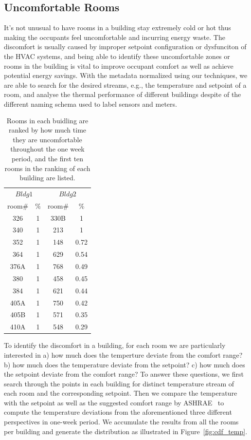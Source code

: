 \subsection{Uncomfortable Rooms}
It's not unusual to have rooms in a building stay extremely cold or hot thus making the occupants feel uncomfortable and incurring energy waste. The discomfort is usually caused by improper setpoint configuration or dysfunciton of the HVAC systems, and being able to identify these uncomfortable zones or rooms in the building is vital to improve occupant comfort as well as achieve potential energy savings. With the metadata normalized using our techniques, we are able to search for the desired streams, e.g., the temperature and setpoint of a room, and analyse the thermal performance of different buildings despite of the different naming schema used to label sensors and meters.

\begin{table}[ht!]
 \begin{center}
	\begin{tabular}{|c|c|c|c|}
	\multicolumn{2}{c}{$Bldg 1$}
	 & \multicolumn{2}{c}{$Bldg 2$}\\
	\cline{1-4} 
	 room\# & \% & room\# & \%\\
	\cline{1-4}
	 326 & 1 & 330B & 1\\
	\cline{1-4}
	 340 & 1 & 213 & 1\\
	\cline{1-4}
	352 & 1 & 148 & 0.72\\
	\cline{1-4}
	364 & 1 & 629 & 0.54\\
	\cline{1-4}
	376A & 1 & 768 & 0.49\\
	\cline{1-4}
	380 & 1 & 458 & 0.45\\
	\cline{1-4}
	384 & 1 & 621 & 0.44\\
	\cline{1-4}
	405A & 1 & 750 & 0.42\\
	\cline{1-4}
	405B & 1 & 571 & 0.35\\
	\cline{1-4}
	410A & 1 & 548 & 0.29\\
	\cline{1-4}
	\end{tabular}
 \end{center}
 \caption{Rooms in each buidling are ranked by how much time they are uncomfortable throughout the one week period, and the first ten rooms in the ranking of each building are listed.}
 \label{tab:uncmft}
\end{table}

To identify the discomfort in a building, for each room we are particularly interested in a) how much does the temperture deviate from the comfort range? b) how much does the temperature deviate from the setpoint? c) how much does the setpoint deviate from the comfort range? To answer these questions, we first search through the points in each building for distinct temperature stream of each room and the corresponding setpoint. Then we compare the temperature with the setpoint as well as the suggested comfort range by ASHRAE~\cite{} to compute the temperature deviations from the aforementioned three different perspectives in one-week period. We accumulate the results from all the rooms per building and generate the distribution as illustrated in Figure~\ref{fig:cdf_temp}.

